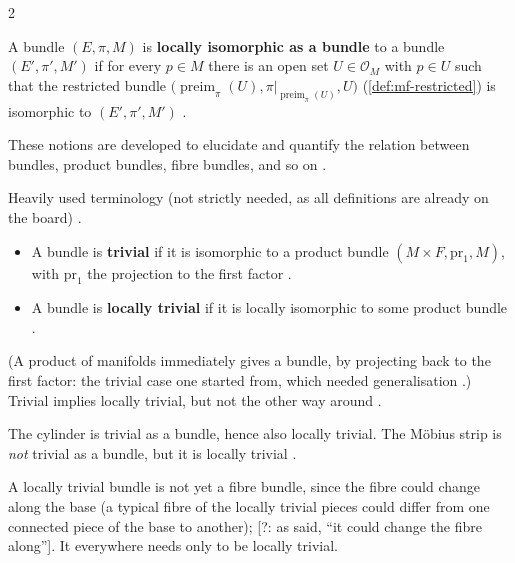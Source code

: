 \begin{paracol}{2}
\begin{definition}\label{def:mf-local-iso}
A bundle $(E,\pi,M)$ is \textbf{locally isomorphic as a bundle} to a bundle $(E',\pi',M')$ if for every $p\in M$ there is an open set $U\in\mathcal O_M$ with $p\in U$ such that the restricted bundle
$\bigl(\operatorname{preim}_\pi(U),\pi|_{\operatorname{preim}_\pi(U)},U\bigr)$ (\cref{def:mf-restricted}) is isomorphic to $(E',\pi',M')$ .
\end{definition}
These notions are developed to elucidate and quantify the relation between bundles, product bundles, fibre bundles, and so on .

\begin{definition}\label{def:mf-trivial}
Heavily used terminology (not strictly needed, as all definitions are already on the board) .
\begin{itemize}
  \item A bundle is \textbf{trivial} if it is isomorphic to a product bundle $(M\times F,\mathrm{pr}_1,M)$, with $\mathrm{pr}_1$ the projection to the first factor .
  \item A bundle is \textbf{locally trivial} if it is locally isomorphic to some product bundle .
\end{itemize}
\end{definition}
(A product of manifolds immediately gives a bundle, by projecting back to the first factor: the trivial case one started from, which needed generalisation .)
Trivial implies locally trivial, but not the other way around .
\begin{example}\label{ex:mf-cyl-moeb}
The cylinder is trivial as a bundle, hence also locally trivial. The Möbius strip is \emph{not} trivial as a bundle, but it is locally trivial .
\end{example}
A locally trivial bundle is not yet a fibre bundle, since the fibre could change along the base (a typical fibre of the locally trivial pieces could differ from one connected piece of the base to another);  [?: as said, ``it could change the fibre along'']. It everywhere needs only to be locally trivial.


\end{paracol}
